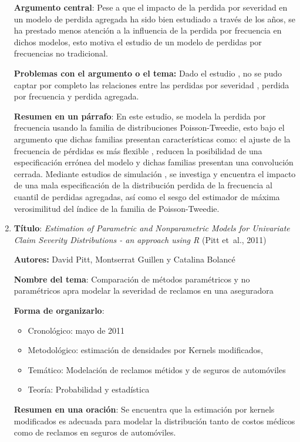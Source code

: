 \documentclass[
  letterpaper,
  onepage,
  openany]{scrreprt}
\begin{document}
\begin{enumerate}
  \textbf{Argumento central}: Pese a que el impacto de la perdida por
  severidad en un modelo de perdida agregada ha sido bien estudiado a
  través de los años, se ha prestado menos atención a la influencia de
  la perdida por frecuencia en dichos modelos, esto motiva el estudio de
  un modelo de perdidas por frecuencias no tradicional.

  \textbf{Problemas con el argumento o el tema:} Dado el estudio , no se
  pudo captar por completo las relaciones entre las perdidas por
  severidad , perdida por frecuencia y perdida agregada.

  \textbf{Resumen en un párrafo}: En este estudio, se modela la perdida
  por frecuencia usando la familia de distribuciones Poisson-Tweedie,
  esto bajo el argumento que dichas familias presentan características
  como: el ajuste de la frecuencia de pérdidas es más flexible , reducen
  la posibilidad de una especificación errónea del modelo y dichas
  familias presentan una convolución cerrada. Mediante estudios de
  simulación , se investiga y encuentra el impacto de una mala
  especificación de la distribución perdida de la frecuencia al cuantil
  de perdidas agregadas, así como el sesgo del estimador de máxima
  verosimilitud del índice de la familia de Poisson-Tweedie.
\item
  \textbf{Título}: \emph{Estimation of Parametric and Nonparametric
  Models for Univariate Claim Severity Distributions - an approach using
  R} (Pitt et~al., 2011)

  \textbf{Autores:} David Pitt, Montserrat Guillen y Catalina Bolancé

  \textbf{Nombre del tema}: Comparación de métodos paramétricos y no
  paramétricos apra modelar la severidad de reclamos en una aseguradora

  \textbf{Forma de organizarlo}:

  \begin{itemize}
  \item
    Cronológico: mayo de 2011
  \item
    Metodológico: estimación de densidades por Kernels modificados,
  \item
    Temático: Modelación de reclamos métidos y de seguros de automóviles
  \item
    Teoría: Probabilidad y estadística
  \end{itemize}

  \textbf{Resumen en una oración}: Se encuentra que la estimación por
  kernels modificados es adecuada para modelar la distribución tanto de
  costos médicos como de reclamos en seguros de automóviles.


\end{enumerate}
\end{document}
